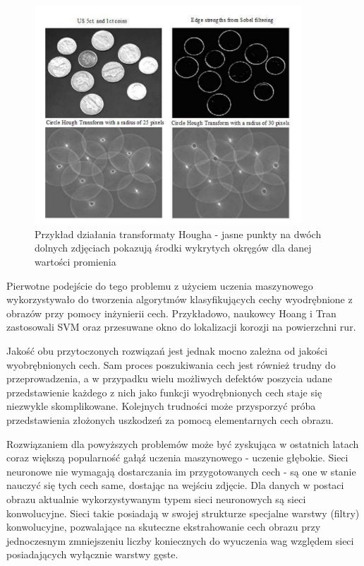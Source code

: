 \documentclass[polish,12pt]{aghthesis}
\begin{document}
\begin{figure}[ht]
    \centering
    \includegraphics[width=10cm]{images/hough.PNG}
    \caption{Przykład działania transformaty Hougha - jasne punkty na dwóch dolnych zdjęciach pokazują środki wykrytych okręgów dla danej wartości promienia\cite{artHough}}
    \label{fig:hough}
\end{figure}
\par
Pierwotne podejście do tego problemu z użyciem uczenia maszynowego wykorzystywało do tworzenia algorytmów klasyfikujących cechy wyodrębnione z obrazów przy pomocy inżynierii cech. Przykładowo, naukowcy Hoang i Tran zastosowali SVM oraz przesuwane okno do lokalizacji korozji na powierzchni rur\cite{artHoang}. 
\par
Jakość obu przytoczonych rozwiązań jest jednak mocno zależna od jakości wyobrębnionych cech. Sam proces poszukiwania cech jest również trudny do przeprowadzenia, a w przypadku wielu możliwych defektów poszycia udane przedstawienie każdego z nich jako funkcji wyodrębnionych cech staje się niezwykle skomplikowane. Kolejnych trudności może przysporzyć próba przedstawienia złożonych uszkodzeń za pomocą elementarnych cech obrazu.
\par
Rozwiązaniem dla powyższych problemów może być zyskująca w ostatnich latach coraz większą popularność gałąź uczenia maszynowego - uczenie głębokie. Sieci neuronowe nie wymagają dostarczania im przygotowanych cech - są one w stanie nauczyć się tych cech same, dostając na wejściu zdjęcie. Dla danych w postaci obrazu aktualnie wykorzystywanym typem sieci neuronowych są sieci konwolucyjne. Sieci takie posiadają w swojej strukturze specjalne warstwy (filtry) konwolucyjne, pozwalające na skuteczne ekstrahowanie cech obrazu przy jednoczesnym zmniejszeniu liczby koniecznych do wyuczenia wag względem sieci posiadających wyłącznie warstwy gęste.
\end{document}
